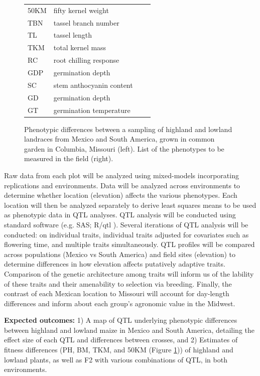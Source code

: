 \begin{figure}[ht!]
\begin{minipage}[c]{0.40\textwidth}
\begin{tabular}{llcc}
		50KM & fifty kernel weight \\
		TBN & tassel branch number \\
		TL & tassel length \\
		TKM & total kernel mass \\
		RC & root chilling response \\
		GDP & germination depth \\
		SC & stem anthocyanin content \\
		GD & germination depth \\
		GT & germination temperature \\\bottomrule
		\end{tabular}
	\end{minipage}
 	\caption{ Phenotypic differences between a sampling of highland and lowland landraces from Mexico and South America, grown in common garden in Columbia, Missouri (left). List of the phenotypes to be measured in the field (right). }%
	\label{fig:phenos}
\end{figure}

Raw data from each plot will be analyzed using mixed-models incorporating replications and environments.  Data will be analyzed across environments to determine whether location (elevation) affects the various phenotypes.  Each location will then be analyzed separately to derive least squares means to be used as  phenotypic data in QTL analyses.  QTL analysis will be conducted using standard software (e.g. SAS; R/qtl \citealp{Broman2003a}).  Several iterations of QTL analysis will be conducted: on individual traits, individual traits adjusted for covariates such as flowering time, and multiple traits simultaneously.   QTL profiles will be compared across populations (Mexico vs South America) and field sites (elevation) to determine differences in how elevation affects putatively adaptive traits.  Comparison of the genetic architecture among traits will inform us of the lability of these traits and their amenability to selection via breeding.  Finally, the contrast of each Mexican location to Missouri will account for day-length differences and inform about each group's agronomic value in the Midwest. 

{\bf Expected outcomes:} 1) A map of QTL underlying phenotypic differences between highland and lowland maize in Mexico and South America, detailing the effect size of each QTL and differences between crosses, and 2) Estimates of fitness differences (PH, BM, TKM, and 50KM (Figure \ref{fig:phenos})) of highland and lowland plants, as well as F2 with various combinations of QTL, in both environments. 

